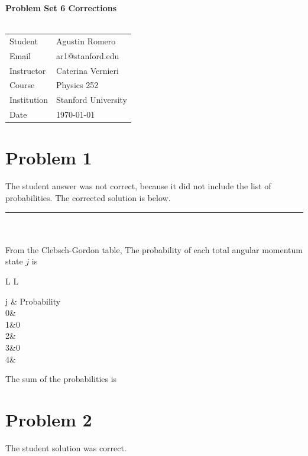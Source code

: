 \documentclass{article}
\newcommand{\tabb}[2]{
\begin{table}[H]
\begin{tabular}{#1}
#2
\end{tabular}
\end{table}}
\begin{document}
\begin{center}
\textbf{\Large{Problem Set 6 Corrections}}\\~\\
\begin{tabular}{l l}
Student&Agustin Romero\\
Email&ar1@stanford.edu\\
Instructor&Caterina Vernieri\\
Course&Physics 252\\
Institution&Stanford University\\
Date&\today\\
\end{tabular}
\end{center}
\section*{Problem 1}
The student answer was not correct, because it did not include the list of probabilities. The corrected solution is below.\\
\hrule
~\\~\\
From the Clebsch-Gordon table,
The probability of each total angular momentum state $j$ is
\tabb{L L}{
j & \textrm{Probability}\\
0&\\
1&0\\
2&\fr{2}{7}\\
3&0\\
4&\fr{18}{35}}
The sum of the probabilities is
\section*{Problem 2}
The student solution was correct.
\end{document}
